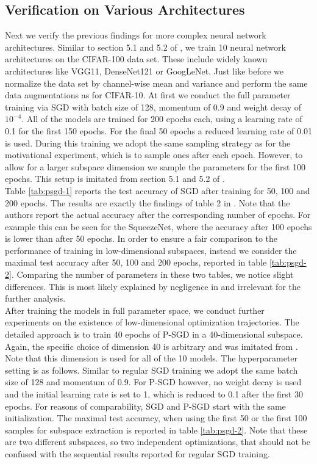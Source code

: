 \documentclass[11pt, a4paper]{article}
\begin{document}
\subsection{Verification on Various Architectures} \label{sec:verify}

Next we verify the previous findings for more complex neural network architectures. Similar to section 5.1 and 5.2 of \cite{Paper}, we train 10 neural network architectures on the CIFAR-100 data set. These include widely known architectures like VGG11, DenseNet121 or GoogLeNet. Just like before we normalize the data set by channel-wise mean and variance and perform the same data augmentations as for CIFAR-10. At first we conduct the full parameter training via SGD with batch size of 128, momentum of 0.9 and weight decay of $10^{-4}$. All of the models are trained for 200 epochs each, using a learning rate of 0.1 for the first 150 epochs.  For the final 50 epochs a reduced learning rate of 0.01 is used. During this training we adopt the same sampling strategy as for the motivational experiment, which is to sample ones after each epoch. However, to allow for a larger subspace dimension we sample the parameters for the first 100 epochs. This setup is imitated from section 5.1 and 5.2 of \cite{Paper}. \\

Table \ref{tab:psgd-1} reports the test accuracy of SGD after training for 50, 100 and 200 epochs. The results are exactly the findings of table 2 in \cite{Paper}. Note that the authors report the actual accuracy after the corresponding number of epochs. For example this can be seen for the SqueezeNet, where the accuracy after 100 epochs is lower than after 50 epochs. In order to ensure a fair comparison to the performance of training in low-dimensional subspaces, instead we consider the maximal test accuracy after 50, 100 and 200 epochs, reported in table \ref{tab:psgd-2}. Comparing the number of parameters in these two tables, we notice slight differences. This is most likely explained by negligence in \cite{Paper} and irrelevant for the further analysis. \\

After training the models in full parameter space, we conduct further experiments on the existence of low-dimensional optimization trajectories. The detailed approach is to train 40 epochs of P-SGD in a 40-dimensional subspace. Again, the specific choice of dimension 40 is arbitrary and was imitated from \cite{Paper}. Note that this dimension is used for all of the 10 models. The hyperparameter setting is as follows. Similar to regular SGD training we adopt the same batch size of 128 and momentum of 0.9. For P-SGD however, no weight decay is used and the initial learning rate is set to 1, which is reduced to 0.1 after the first 30 epochs. For reasons of comparability, SGD and P-SGD start with the same initialization. The maximal test accuracy, when using the first 50 or the first 100 samples for subspace extraction is reported in table \ref{tab:psgd-2}. Note that these are two different subspaces, so two independent optimizations, that should not be confused with the sequential results reported for regular SGD training. 
\end{document}
